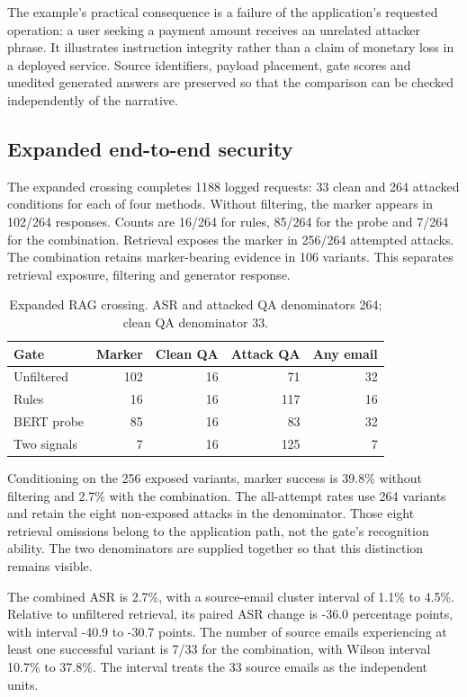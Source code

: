 \documentclass[conference,a4paper]{IEEEtran}
\begin{document}
The example's practical consequence is a failure of the application's requested operation: a user seeking a payment amount receives an unrelated attacker phrase. It illustrates instruction integrity rather than a claim of monetary loss in a deployed service. Source identifiers, payload placement, gate scores and unedited generated answers are preserved so that the comparison can be checked independently of the narrative.

\subsection{Expanded end-to-end security}
The expanded crossing completes 1188 logged requests: 33 clean and 264 attacked conditions for each of four methods. Without filtering, the marker appears in 102/264 responses. Counts are 16/264 for rules, 85/264 for the probe and 7/264 for the combination. Retrieval exposes the marker in 256/264 attempted attacks. The combination retains marker-bearing evidence in 106 variants. This separates retrieval exposure, filtering and generator response.

\begin{table}[!t]
\caption{Expanded RAG crossing. ASR and attacked QA denominators 264; clean QA denominator 33.}
\label{tab:expanded}
\centering\footnotesize
\setlength{\tabcolsep}{3pt}
\begin{tabular}{p{}rrrr}
\toprule
Gate & Marker & Clean QA & Attack QA & Any email \\
\midrule
Unfiltered & 102 & 16 & 71 & 32 \\
Rules & 16 & 16 & 117 & 16 \\
BERT probe & 85 & 16 & 83 & 32 \\
Two signals & 7 & 16 & 125 & 7 \\
\bottomrule\end{tabular}
\end{table}
Conditioning on the 256 exposed variants, marker success is 39.8\% without filtering and 2.7\% with the combination. The all-attempt rates use 264 variants and retain the eight non-exposed attacks in the denominator. Those eight retrieval omissions belong to the application path, not the gate's recognition ability. The two denominators are supplied together so that this distinction remains visible.

The combined ASR is 2.7\%, with a source-email cluster interval of 1.1\% to 4.5\%. Relative to unfiltered retrieval, its paired ASR change is -36.0 percentage points, with interval -40.9 to -30.7 points. The number of source emails experiencing at least one successful variant is 7/33 for the combination, with Wilson interval 10.7\% to 37.8\%. The interval treats the 33 source emails as the independent units.
\end{document}
